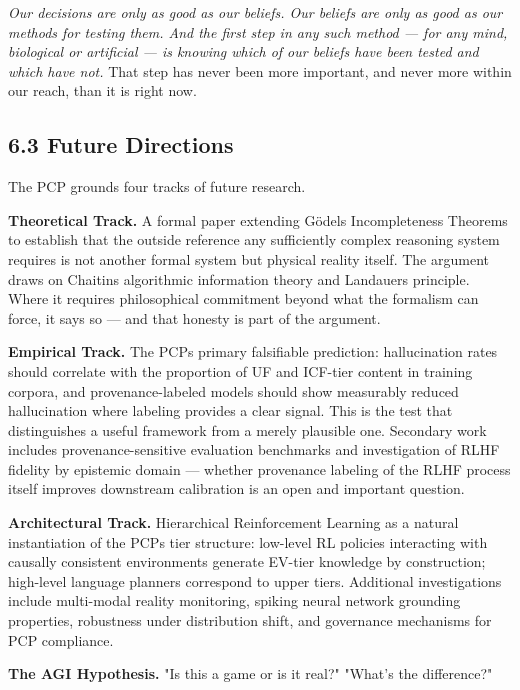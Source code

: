 \documentclass[
]{article}
\begin{document}
\emph{Our decisions are only as good as our beliefs. Our beliefs are
only as good as our methods for testing them. And the first step in any
such method --- for any mind, biological or artificial --- is knowing
which of our beliefs have been tested and which have not.} That step has
never been more important, and never more within our reach, than it is
right now.

\subsection{6.3 Future Directions}\label{future-directions}

The PCP grounds four tracks of future research.

\textbf{Theoretical Track.} A formal paper extending
Gödel\textquotesingle s Incompleteness Theorems to establish that the
outside reference any sufficiently complex reasoning system requires is
not another formal system but physical reality itself. The argument
draws on Chaitin\textquotesingle s algorithmic information theory and
Landauer\textquotesingle s principle. Where it requires philosophical
commitment beyond what the formalism can force, it says so --- and that
honesty is part of the argument.

\textbf{Empirical Track.} The PCP\textquotesingle s primary falsifiable
prediction: hallucination rates should correlate with the proportion of
UF and ICF-tier content in training corpora, and provenance-labeled
models should show measurably reduced hallucination where labeling
provides a clear signal. This is the test that distinguishes a useful
framework from a merely plausible one. Secondary work includes
provenance-sensitive evaluation benchmarks and investigation of RLHF
fidelity by epistemic domain --- whether provenance labeling of the RLHF
process itself improves downstream calibration is an open and important
question.

\textbf{Architectural Track.} Hierarchical Reinforcement Learning as a
natural instantiation of the PCP\textquotesingle s tier structure:
low-level RL policies interacting with causally consistent environments
generate EV-tier knowledge by construction; high-level language planners
correspond to upper tiers. Additional investigations include multi-modal
reality monitoring, spiking neural network grounding properties,
robustness under distribution shift, and governance mechanisms for PCP
compliance.

\textbf{The AGI Hypothesis.} "Is this a game or is it real?" "What's the
difference?"
\end{document}
